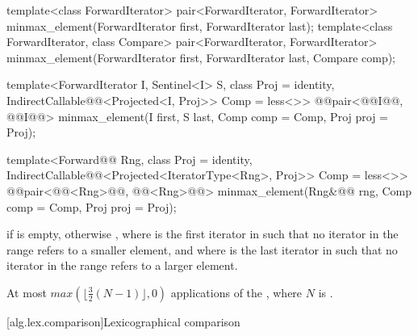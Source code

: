 %
\begin{removedblock}
\begin{itemdecl}
template<class ForwardIterator>
  pair<ForwardIterator, ForwardIterator>
    minmax_element(ForwardIterator first, ForwardIterator last);
template<class ForwardIterator, class Compare>
  pair<ForwardIterator, ForwardIterator>
    minmax_element(ForwardIterator first, ForwardIterator last, Compare comp);
\end{itemdecl}
\end{removedblock}
\begin{addedblock}
\begin{itemdecl}
template<ForwardIterator I, Sentinel<I> S, class Proj = identity,
    IndirectCallable@@<Projected<I, Proj>> Comp = less<>>
  @@pair<@@I@\newtxt{)}@, @@I@\newtxt{)}@>
    minmax_element(I first, S last, Comp comp = Comp{}, Proj proj = Proj{});

template<Forward@@ Rng, class Proj = identity,
    IndirectCallable@@<Projected<IteratorType<Rng>, Proj>> Comp = less<>>
  @@pair<@@<Rng>@\newtxt{)}@, @@<Rng>@\newtxt{)}@>
    minmax_element(Rng&@\newtxt{\&}@ rng, Comp comp = Comp{}, Proj proj = Proj{});
\end{itemdecl}
\end{addedblock}

\begin{itemdescr}
\pnum
\returns
{} if  is empty, otherwise
, where  is
the first iterator in  such that no iterator in the range refers to a smaller
element, and where  is the last iterator in  such that no iterator
in the range refers to a larger element.

\pnum
\complexity
At most
$max(\lfloor{\frac{3}{2}} (N-1)\rfloor, 0)$
applications of the ,
where $N$ is .
\end{itemdescr}

[alg.lex.comparison]{Lexicographical comparison}

